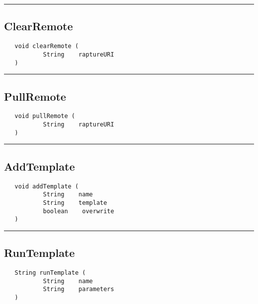 \rule{15cm}{2pt}
\subsection{ClearRemote}
\label{Api:ClearRemote}
\begin{verbatim}
   void clearRemote (
           String    raptureURI
   )
\end{verbatim}



\rule{15cm}{2pt}
\subsection{PullRemote}
\label{Api:PullRemote}
\begin{verbatim}
   void pullRemote (
           String    raptureURI
   )
\end{verbatim}



\rule{15cm}{2pt}
\subsection{AddTemplate}
\label{Api:AddTemplate}
\begin{verbatim}
   void addTemplate (
           String    name
           String    template
           boolean    overwrite
   )
\end{verbatim}



\rule{15cm}{2pt}
\subsection{RunTemplate}
\label{Api:RunTemplate}
\begin{verbatim}
   String runTemplate (
           String    name
           String    parameters
   )
\end{verbatim}



